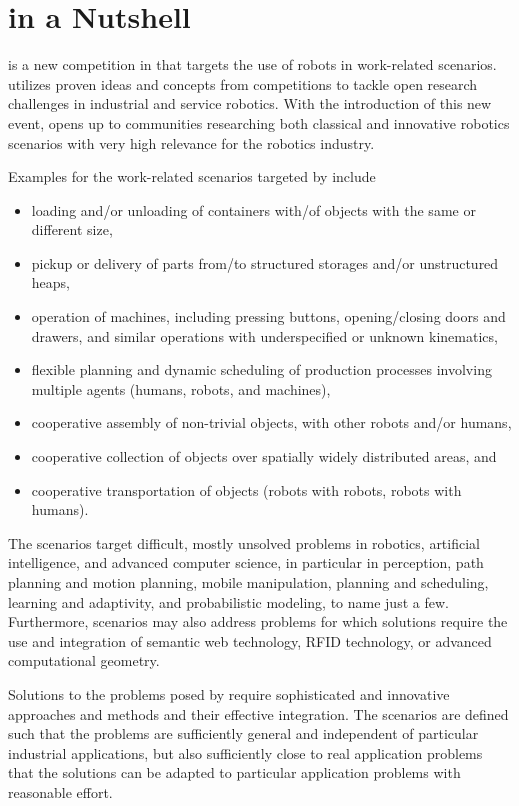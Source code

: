 \section{\RCAW in a Nutshell}\label{sec:at_work_nushell}
\RCAW is a new competition in \RC that targets the use of robots in work-related scenarios. \RCAW utilizes proven ideas and concepts from \RC competitions to tackle open research challenges in industrial and service robotics. With the introduction of this new event, \RC opens up to communities researching both classical and innovative robotics scenarios with very high relevance for the robotics industry. 
\par
Examples for the work-related scenarios targeted by \RCAW include 

\begin{itemize}
	\item loading and/or unloading of containers with/of objects with the same 	or different size,
	\item pickup or delivery of parts from/to structured storages and/or 				unstructured heaps,
	\item operation of machines, including pressing buttons, opening/closing 			doors and drawers, and similar operations with underspecified or unknown 			kinematics,
	\item flexible planning and dynamic scheduling of production processes 			involving multiple agents (humans, robots, and machines),
	\item cooperative assembly of non-trivial objects, with other robots 				and/or humans,
	\item cooperative collection of objects over spatially widely  distributed 	areas, and
	\item cooperative transportation of objects (robots with robots, robots 			with humans).
\end{itemize}

The \RCAW scenarios target difficult, mostly unsolved problems in robotics, artificial intelligence, and advanced computer science, in particular in perception, path planning and motion planning, mobile manipulation, planning and scheduling, learning and adaptivity, and probabilistic modeling, to name just a few. Furthermore, \RCAW scenarios may also address problems for which solutions require the use and integration of semantic web technology, RFID technology, or advanced computational geometry.
\par

Solutions to the problems posed by \RCAW require sophisticated and innovative approaches and methods and their effective integration. The scenarios are defined such that the problems are sufficiently general and independent of particular industrial applications, but also sufficiently close to real application problems that the solutions can be adapted to particular application problems with reasonable effort.  
\par

